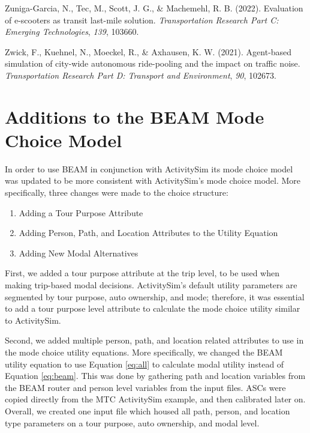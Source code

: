 \documentclass[fancy, masters]{byuthesis}
\newlength{\cslhangindent}
\newlength{\cslentryspacingunit} %
\newenvironment{CSLReferences}[2] %
 {%
  \setlength{\parindent}{0pt}
  \ifodd #1
  \let\oldpar\par
  \def\par{\hangindent=\cslhangindent\oldpar}
  \fi
  \setlength{\parskip}{#2\cslentryspacingunit}
 }%
 {}
\providecommand{\tightlist}{%
  \setlength{\itemsep}{0pt}\setlength{\parskip}{0pt}}
\begin{document}
\begin{CSLReferences}{1}{0}
\leavevmode{}%
Zuniga-Garcia, N., Tec, M., Scott, J. G., \& Machemehl, R. B. (2022). Evaluation of e-scooters as transit last-mile solution. \emph{Transportation Research Part C: Emerging Technologies}, \emph{139}, 103660.

\leavevmode{}%
Zwick, F., Kuehnel, N., Moeckel, R., \& Axhausen, K. W. (2021). Agent-based simulation of city-wide autonomous ride-pooling and the impact on traffic noise. \emph{Transportation Research Part D: Transport and Environment}, \emph{90}, 102673.

\end{CSLReferences}

\hypertarget{appendix-appendix}{%
\appendix}


\hypertarget{apexA}{%
\chapter{Additions to the BEAM Mode Choice Model}\label{apexA}}

In order to use BEAM in conjunction with ActivitySim its mode choice model was updated to be more consistent with ActivitySim's mode choice model. More specifically, three changes were made to the choice structure:

\begin{enumerate}
\def\labelenumi{\arabic{enumi}.}
\tightlist
\item
  Adding a Tour Purpose Attribute
\item
  Adding Person, Path, and Location Attributes to the Utility Equation
\item
  Adding New Modal Alternatives
\end{enumerate}

First, we added a tour purpose attribute at the trip level, to be used when making trip-based modal decisions. ActivitySim's default utility parameters are segmented by tour purpose, auto ownership, and mode; therefore, it was essential to add a tour purpose level attribute to calculate the mode choice utility similar to ActivitySim.

Second, we added multiple person, path, and location related attributes to use in the mode choice utility equations. More specifically, we changed the BEAM utility equation to use Equation \eqref{eq:all} to calculate modal utility instead of Equation \eqref{eq:beam}. This was done by gathering path and location variables from the BEAM router and person level variables from the input files. ASCs were copied directly from the MTC ActivitySim example, and then calibrated later on. Overall, we created one input file which housed all path, person, and location type parameters on a tour purpose, auto ownership, and modal level.
\end{document}
